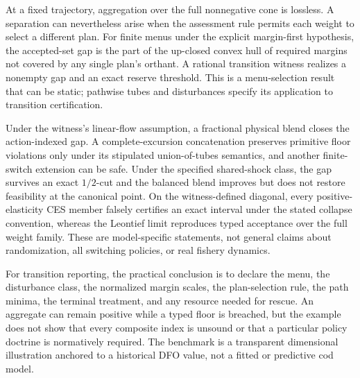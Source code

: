 At a fixed trajectory, aggregation over the full nonnegative cone is lossless. A separation can nevertheless arise when the assessment rule permits each weight to select a different plan. For finite menus under the explicit margin-first hypothesis, the accepted-set gap is the part of the up-closed convex hull of required margins not covered by any single plan's orthant. A rational transition witness realizes a nonempty gap and an exact reserve threshold. This is a menu-selection result that can be static; pathwise tubes and disturbances specify its application to transition certification.

Under the witness's linear-flow assumption, a fractional physical blend closes the action-indexed gap. A complete-excursion concatenation preserves primitive floor violations only under its stipulated union-of-tubes semantics, and another finite-switch extension can be safe. Under the specified shared-shock class, the gap survives an exact $1/2$-cut and the balanced blend improves but does not restore feasibility at the canonical point. On the witness-defined diagonal, every positive-elasticity CES member falsely certifies an exact interval under the stated collapse convention, whereas the Leontief limit reproduces typed acceptance over the full weight family. These are model-specific statements, not general claims about randomization, all switching policies, or real fishery dynamics.

For transition reporting, the practical conclusion is to declare the menu, the disturbance class, the normalized margin scales, the plan-selection rule, the path minima, the terminal treatment, and any resource needed for rescue. An aggregate can remain positive while a typed floor is breached, but the example does not show that every composite index is unsound or that a particular policy doctrine is normatively required. The benchmark is a transparent dimensional illustration anchored to a historical DFO value, not a fitted or predictive cod model.

